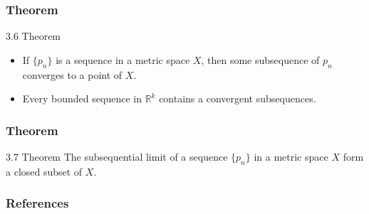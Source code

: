 \documentclass{beamer}
\begin{document}
\begin{frame}
    \frametitle{Theorem}

    \begin{block}{3.6 Theorem }
        \begin{itemize}
            \item If \(\{p_n\}\) is a sequence in a metric space \(X\), then some subsequence of \(p_n\) converges to a point of \(X\). \pause
            \item Every bounded sequence in \(\mathbb{R}^k\) contains a convergent subsequences. 
        \end{itemize}
    \end{block}

\end{frame}

\begin{frame}
    \frametitle{Theorem}

    \begin{block}{3.7 Theorem}
        The subsequential limit of a sequence \(\{p_n\}\) in a metric space \(X\) form a closed subset of \(X\). 
    \end{block}

\end{frame}

\begin{frame}
    \frametitle{References}
\end{frame}
\end{document}
